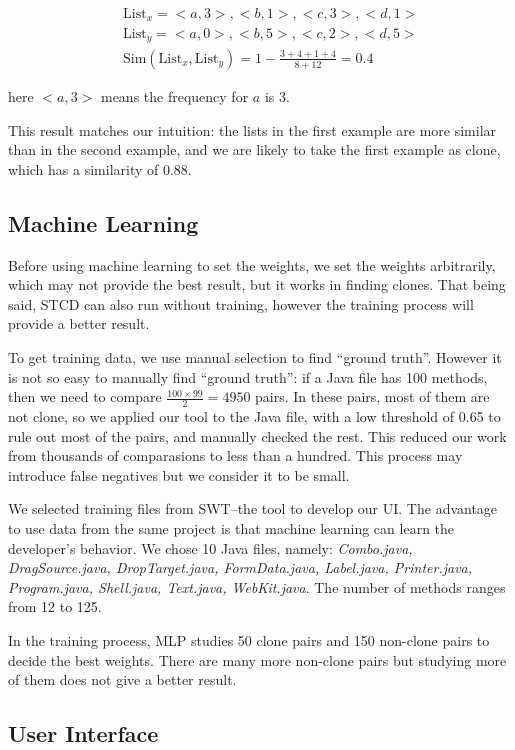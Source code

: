 \documentclass[../main.tex]{subfiles}
\begin{document}
\begin{eqnarray}\nonumber
&&\text{List}_x = {<a, 3>, <b, 1>, <c, 3>, <d, 1>}\\ \nonumber
&&\text{List}_y = {<a, 0>, <b, 5>, <c, 2>, <d, 5>} \\ 
&&\text{Sim}(\text{List}_x, \text{List}_y) = 1 - \frac{3 + 4 + 1 + 4}{8 + 12} = 0.4
\end{eqnarray}

here $<a, 3>$ means the frequency for $a$ is 3.

This result matches our intuition: the lists in the first example are more similar than in the second example, and we are likely to take the first example as clone, which has a similarity of 0.88.

\subsection{Machine Learning}

Before using machine learning to set the weights, we set the weights arbitrarily, which may not provide the best result, but it works in finding clones. That being said, STCD can also run without training, however the training process will provide a better result. 

To get training data, we use manual selection to find ``ground truth''. However it is not so easy to manually find ``ground truth'': if a Java file has 100 methods, then we need to compare $\frac{100\times 99}{2} = 4950$ pairs. In these pairs, most of them are not clone, so we applied our tool to the Java file, with a low threshold of 0.65 to rule out most of the pairs, and manually checked the rest. This reduced our work from thousands of comparasions to less than a hundred. This process may introduce false negatives but we consider it to be small.

We selected training files from SWT--the tool to develop our UI. The advantage to use data from the same project is that machine learning can learn the developer's behavior. We chose 10 Java files, namely: \textit{Combo.java, DragSource.java, DropTarget.java, FormData.java, Label.java, Printer.java, Program.java, Shell.java, Text.java, WebKit.java}. The number of methods ranges from 12 to 125.

In the training process, MLP studies 50 clone pairs and 150 non-clone pairs to decide the best weights. There are many more non-clone pairs but studying more of them does not give a better result.

\subsection{User Interface}
\end{document}
